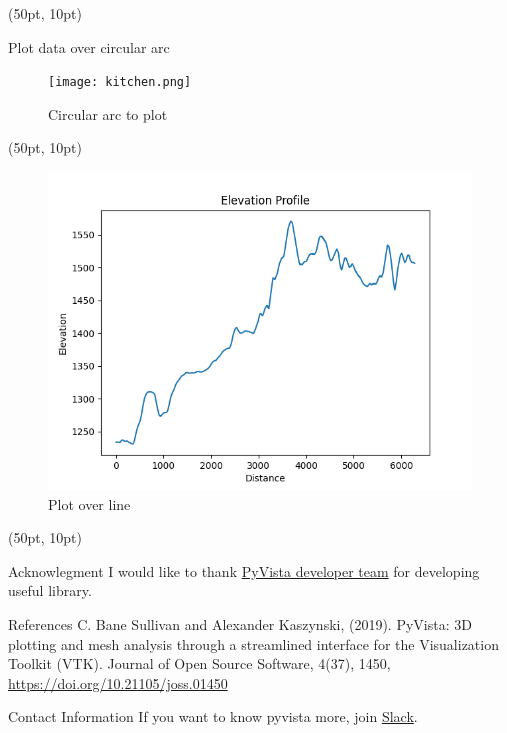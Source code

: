 \documentclass[aspectratio=169,12pt]{beamer}
\begin{document}
\begin{frame}[fragile]
\begin{textblock*}{350pt}(50pt, 10pt)
\begin{block}{Plot data over circular arc}
\begin{figure}
\texttt{[image: kitchen.png]}
\caption{Circular arc to plot \label{CircularArcToPlotFigure}}
\end{figure}
\end{block}
\end{textblock*}
\end{frame}

\begin{frame}[fragile]
\begin{textblock*}{350pt}(50pt, 10pt)

\begin{figure}
\includegraphics[width=0.3\linewidth]{elevation.png}
\caption{Plot over line \label{PlotOverCircularArcFigure}}
\end{figure}
\end{textblock*}
\end{frame}

\begin{frame}[fragile]
\begin{textblock*}{350pt}(50pt, 10pt)
\begin{block}{Acknowlegment}
I would like to thank \href{https://github.com/orgs/pyvista/teams/developers}{PyVista developer team} for developing useful library.
\end{block}
\begin{block}{References}
C. Bane Sullivan and Alexander Kaszynski, (2019). PyVista: 3D plotting and mesh analysis through a streamlined interface for the Visualization Toolkit (VTK). Journal of Open Source Software, 4(37), 1450, \url{https://doi.org/10.21105/joss.01450}
\end{block}
\begin{block}{Contact Information}
If you want to know pyvista more, join \href{http://slack.pyvista.org/}{Slack}.
\doclicenseThis
\end{block}
\end{textblock*}

\end{frame}
\end{document}
